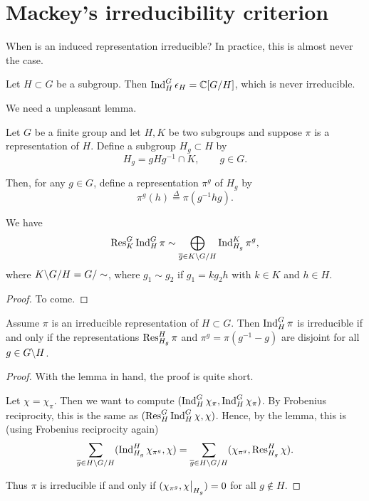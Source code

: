 \documentclass[11pt, english]{article}
\begin{document}
\newpage
\section{Mackey's irreducibility criterion}

When is an induced representation irreducible? In practice, this is almost never the case.

\begin{example}
Let $H \subset G$ be a subgroup. Then $\operatorname{Ind}_H^G \epsilon_H = \mathbb{C}[G/H]$, which is never irreducible.
\end{example}

We need a unpleasant lemma.

Let $G$ be a finite group and let $H,K$ be two subgroups and suppose $\pi$ is a representation of $H$. Define a subgroup $H_g \subset H$ by
$$
H_g = gHg^{-1} \cap K, \qquad g \in G.
$$

Then, for any $g \in G$, define a representation $\pi^g$ of $H_g$ by
$$
\pi^g(h) \stackrel{\Delta}{=} \pi(g^{-1}hg).
$$

\begin{lemma}
 We have 
$$
\operatorname{Res}_K^G \operatorname{Ind}_H^G \pi \sim \bigoplus_{\overline g \in K \backslash G / H } \operatorname{Ind}_{H_g}^K \pi^g,
$$
where $K \backslash G / H = G/\sim$, where $g_1 \sim g_2$ if $g_1=kg_2h$ with $k \in K$ and $h \in H$.
\end{lemma}
\begin{proof}
To come. 
\end{proof}

\begin{thm}[Mackey]
 
Assume $\pi$ is an irreducible representation of $H \subset G$. Then $\operatorname{Ind}_H^G \pi$ is irreducible if and only if the representations $\operatorname{Res}_{H_g}^H \pi$ and $\pi^g = \pi(g^{-1} - g)$ are disjoint for all $g \in G \backslash H$. 
\end{thm}
\begin{proof}
With the lemma in hand, the proof is quite short.

Let $\chi=\chi_\pi$. Then we want to compute $(\operatorname{Ind}_H^G \chi_\pi, \operatorname{Ind}_H^G \chi_\pi)$.  By Frobenius reciprocity, this is the same as $(\operatorname{Res}_H^G \operatorname{Ind}_H^G \chi, \chi)$. Hence, by the lemma, this is (using Frobenius reciprocity again)
$$
\sum_{\overline g \in H \backslash G / H} (\operatorname{Ind}_{H_g}^H \chi_{\pi^g}, \chi)  = \sum_{\overline g \in H \backslash G / H} (\chi_{\pi^g}, \operatorname{Res}_{H_g}^H \chi).
$$

Thus $\pi$ is irreducible if and only if $(\chi_{\pi^g}, \restr{\chi}{H_g})=0$ for all $g \not \in H$.
\end{proof}
\end{document}
